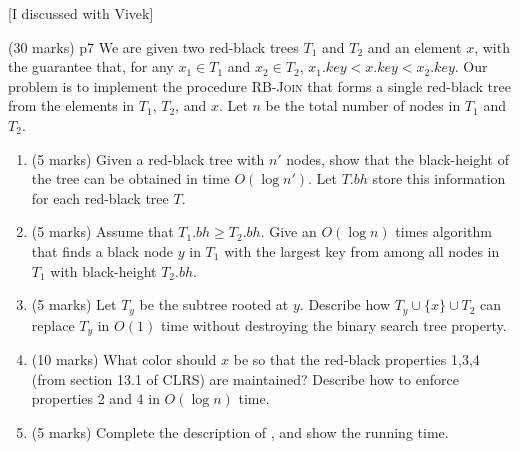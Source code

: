 \documentclass[a4paper, 11pt]{article}
\begin{document}
[I discussed with Vivek]




\begin{problem}{%
		\hfill  (30 marks)
	}{p7%
	}
We are given two red-black trees $T_1$ and $T_2$ and an element $x$, with the guarantee that, for
any $x_1 \in T_1$ and $x_2 \in T_2$, $x_1.key < x.key < x_2.key$. Our problem is to implement the
procedure \textsc{RB-Join} that forms a single red-black tree from the elements in $T_1$, $T_2$, and $x$.
Let $n$ be the total number of nodes in $T_1$ and $T_2$.
\begin{enumerate}[label=(\roman*)]
	\item (5 marks) Given a red-black tree with $n'$ nodes, show that the black-height of the tree can be obtained in time $O(\log n')$. Let $T.bh$ store this information for each red-black tree $T$.
	\item (5 marks) Assume that $T_1.bh\geq T_2.bh$. Give an $O(\log n)$ times algorithm that finds a black node $y$ in $T_1$ with the largest key from among all nodes in $T_1$ with black-height $T_2.bh$.
	\item (5 marks) Let $T_y$ be the subtree rooted at $y$. Describe how $T_y\cup \{x\}\cup T_2$ can replace $T_y$ in $O(1)$ time without destroying the binary search tree property. 
	\item (10 marks) What color should $x$ be so that the red-black properties 1,3,4 (from section 13.1 of CLRS) are maintained? Describe how to enforce properties 2 and 4 in $O(\log n)$ time.
	\item (5 marks) Complete the description of , and show the running time.
\end{enumerate}
\end{problem}
\end{document}
